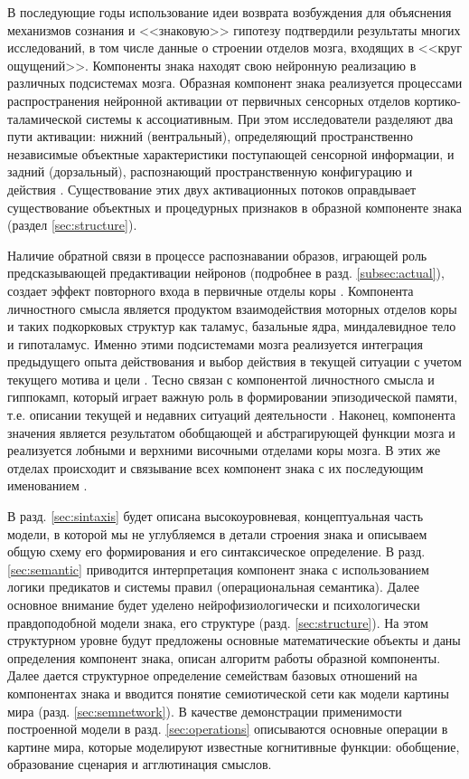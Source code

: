 \documentclass[12pt]{scrartcl}
\begin{document}
	В последующие годы использование идеи возврата возбуждения для объяснения механизмов сознания и <<знаковую>> гипотезу подтвердили результаты многих исследований, в том числе данные о строении отделов мозга, входящих в <<круг ощущений>>. Компоненты знака находят свою нейронную реализацию в различных подсистемах мозга. Образная компонент знака реализуется процессами распространения нейронной активации от первичных сенсорных отделов кортико-таламической системы к ассоциативным.  При этом исследователи разделяют два пути  активации: нижний (вентральный), определяющий пространственно независимые объектные характеристики поступающей сенсорной информации, и задний (дорзальный), распознающий пространственную конфигурацию и действия \cite{Grossberg2014}. Существование этих двух активационных потоков оправдывает существование объектных и процедурных признаков в образной компоненте знака (раздел \ref{sec:structure}).
	
	Наличие обратной связи в процессе распознавании образов, играющей роль предсказывающей предактивации нейронов (подробнее в разд. \ref{subsec:actual}), создает эффект повторного входа в первичные отделы коры \cite{Edelmen1981,Ivanitsky1996}. Компонента личностного смысла является продуктом взаимодействия моторных отделов коры и таких подкорковых структур как таламус, базальные ядра, миндалевидное тело и гипоталамус. Именно этими подсистемами мозга реализуется интеграция предыдущего опыта действования и выбор действия в текущей ситуации с учетом текущего мотива и цели \cite{Gurney2001}. Тесно связан с компонентой личностного смысла и гиппокамп, который играет важную роль в формировании эпизодической памяти, т.е. описании текущей и недавних ситуаций деятельности \cite{Rolls2010}. Наконец, компонента значения является результатом обобщающей и абстрагирующей функции мозга и реализуется лобными и верхними височными отделами коры мозга. В этих же отделах происходит и связывание всех компонент знака с их последующим именованием \cite{Friederici2015,Pulvermuller2013}.

	В разд. \ref{sec:sintaxis} будет описана высокоуровневая, концептуальная часть модели, в которой мы не углубляемся в детали строения знака и описываем общую схему его формирования и его синтаксическое определение. В разд. \ref{sec:semantic} приводится интерпретация компонент знака с использованием логики предикатов и системы правил (операциональная семантика). Далее основное внимание будет уделено нейрофизиологически и психологически правдоподобной модели знака, его структуре (разд. \ref{sec:structure}). На этом структурном уровне будут предложены основные математические объекты и даны определения компонент знака, описан алгоритм работы образной компоненты. Далее дается структурное определение семействам базовых отношений на компонентах знака и вводится понятие семиотической сети как модели картины мира (разд. \ref{sec:semnetwork}). В качестве демонстрации применимости построенной модели в разд. \ref{sec:operations} описываются основные операции в картине мира, которые моделируют известные когнитивные функции: обобщение, образование сценария и агглютинация смыслов.
	
\end{document}
